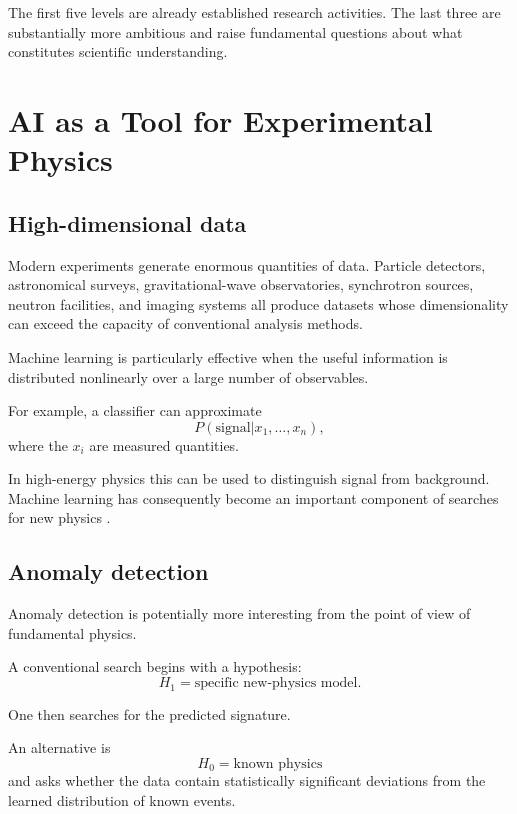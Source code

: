 \documentclass[11pt,a4paper]{article}
\begin{document}
The first five levels are already established research activities. The last
three are substantially more ambitious and raise fundamental questions about
what constitutes scientific understanding.

\section{AI as a Tool for Experimental Physics}

\subsection{High-dimensional data}

Modern experiments generate enormous quantities of data. Particle detectors,
astronomical surveys, gravitational-wave observatories, synchrotron sources,
neutron facilities, and imaging systems all produce datasets whose dimensionality
can exceed the capacity of conventional analysis methods.

Machine learning is particularly effective when the useful information is
distributed nonlinearly over a large number of observables.

For example, a classifier can approximate
\begin{equation}
P(\mathrm{signal}|x_1,\ldots,x_n),
\end{equation}
where the $x_i$ are measured quantities.

In high-energy physics this can be used to distinguish signal from background.
Machine learning has consequently become an important component of searches for
new physics \cite{Karagiorgi2022}.

\subsection{Anomaly detection}

Anomaly detection is potentially more interesting from the point of view of
fundamental physics.

A conventional search begins with a hypothesis:
\begin{equation}
H_1=\text{specific new-physics model}.
\end{equation}

One then searches for the predicted signature.

An alternative is
\begin{equation}
H_0=\text{known physics}
\end{equation}
and asks whether the data contain statistically significant deviations from
the learned distribution of known events.
\end{document}
